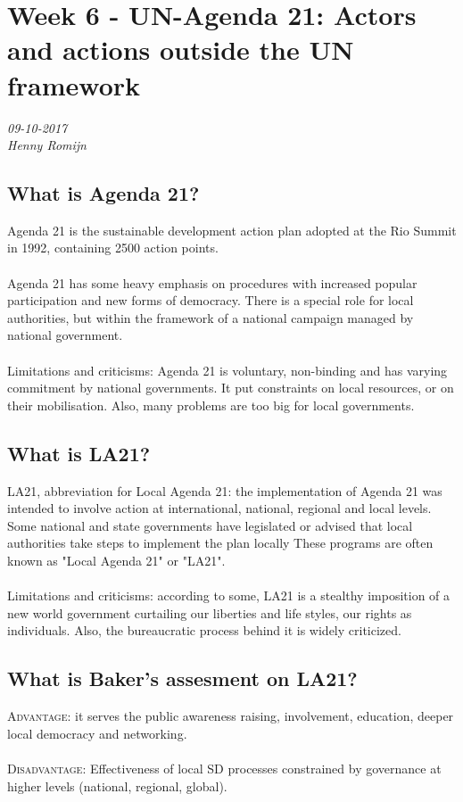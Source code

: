 \chapter{Week 6 - UN-Agenda 21: Actors and actions outside the UN framework}
\textit{09-10-2017 \\
Henny Romijn}

\section{What is Agenda 21?}
Agenda 21 is the sustainable development action plan adopted at the Rio Summit in 1992, containing 2500 action points. \\
\\
Agenda 21 has some heavy emphasis on procedures with increased popular participation and new forms of democracy. There is a special role for local authorities, but within the framework of a national campaign managed by national government. \\
\\
Limitations and criticisms: Agenda 21 is voluntary, non-binding and has varying commitment by national governments. It put constraints on local resources, or on their mobilisation. Also, many problems are too big for local governments.

\section{What is LA21?}
LA21, abbreviation for Local Agenda 21: the implementation of Agenda 21 was intended to involve action at international, national, regional and local levels. Some national and state governments have legislated or advised that local authorities take steps to implement the plan locally These programs are often known as "Local Agenda 21" or "LA21". \\
\\
Limitations and criticisms: according to some, LA21 is a stealthy imposition of a new world government curtailing our liberties and life styles, our rights as individuals. Also, the bureaucratic process behind it is widely criticized.

\section{What is Baker's assesment on LA21?}
\textsc{Advantage}: it serves the public awareness raising, involvement, education, deeper local democracy and networking. \\
\\
\textsc{Disadvantage}: Effectiveness of local SD processes constrained by governance at higher levels (national, regional, global).

